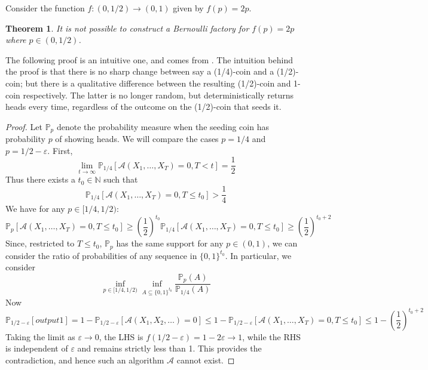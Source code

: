 \documentclass{article}
\newtheorem{thm}{Theorem}
\theoremstyle{definition}
\newcommand{\PR}{\mathbb{P}}
\newcommand{\A}{\mathcal{A}}
\begin{document}
Consider the function $f:(0,1/2)\to (0,1)$ given by $f(p)=2p$.
\begin{thm}
It is not possible to construct a Bernoulli factory for $f(p)=2p$ where $p\in(0,1/2)$.
\end{thm}
The following proof is an intuitive one, and comes from \citet{latuszynski2011}.
The intuition behind the proof is that there is no sharp change between say a (1/4)-coin and a (1/2)-coin; but there is a qualitative difference between the resulting (1/2)-coin and 1-coin respectively. The latter is no longer random, but deterministically returns heads every time, regardless of the outcome on the (1/2)-coin that seeds it.
\begin{proof}
Let $\PR_{p}$ denote the probability measure when the seeding coin has probability $p$ of showing heads. We will compare the cases $p=1/4$ and $p=1/2 - \varepsilon$.
First, 
\begin{equation*}
\lim_{t\to\infty} \PR_{1/4} [\A(X_1,\dots,X_T)=0, T<t] = \frac{1}{2}
\end{equation*}
Thus there exists a $t_0 \in \mathbb{N}$ such that 
\begin{equation*}
\PR_{1/4} [\A(X_1,\dots,X_T)=0, T\leq t_0] > \frac{1}{4}
\end{equation*}
We have for any $p \in [1/4, 1/2)$:
\begin{equation*}
\PR_{p} [\A(X_1,\dots,X_T)=0, T\leq t_0] \geq \left(\frac{1}{2}\right)^{t_0} \PR_{1/4} [\A(X_1,\dots,X_T)=0, T\leq t_0] \geq \left(\frac{1}{2}\right)^{t_0+2}
\end{equation*}
Since, restricted to $T\leq t_0$, $\PR_p$ has the same support for any $p \in (0,1)$, we can consider the ratio of probabilities of any sequence in $\{0,1\}^{t_0}$. In particular, we consider 
\begin{equation*}
\inf_{p\in[1/4,1/2)} \inf_{A\subseteq\{0,1\}^{t_0}} \frac{\PR_{p}(A)}{\PR_{1/4}(A)}
\end{equation*}
Now
\begin{equation*}
\PR_{1/2 - \varepsilon} [output 1] = 1-\PR_{1/2 - \varepsilon} [\A(X_1,X_2,\dots)=0]  \leq 1- \PR_{1/2 - \varepsilon} [\A(X_1,\dots,X_T)=0, T\leq t_0] \leq 1- \left(\frac{1}{2}\right)^{t_0+2}
\end{equation*}
Taking the limit as $\varepsilon\to 0$, the LHS is $f(1/2 - \varepsilon) = 1-2\varepsilon \rightarrow 1$, while the RHS is independent of $\varepsilon$ and remains strictly less than 1. This provides the contradiction, and hence such an algorithm $\A$ cannot exist.

\end{proof}


\end{document}
